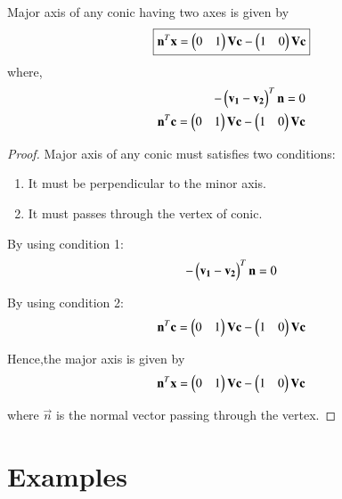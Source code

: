 \documentclass[journal,12pt,twocolumn]{IEEEtran}
\begin{document}
\begin{lemma}
Major axis of any conic having two axes is given by
\begin{align}
     \boxed{\mathbf{n}^T\mathbf{x} = \begin{pmatrix}0 & 1\end{pmatrix}\mathbf{V}\mathbf{c} - \begin{pmatrix}1 & 0\end{pmatrix}\mathbf{V}\mathbf{c}}
\end{align}
where,
\begin{align}
    -\begin{pmatrix}\mathbf{v_1} - \mathbf{v_2}\end{pmatrix}^T\mathbf{n} = 0 
    \\
    \mathbf{n}^T\mathbf{c} = \begin{pmatrix}0 & 1\end{pmatrix}\mathbf{V}\mathbf{c} - \begin{pmatrix}1 & 0\end{pmatrix}\mathbf{V}\mathbf{c}
\end{align}
\end{lemma}

\begin{proof}
Major axis of any conic must satisfies two conditions:

\begin{enumerate}
    \item It must be perpendicular to the minor axis.
    \item It must passes through the vertex of conic.
\end{enumerate}

By using condition 1:
\begin{align}
    -\begin{pmatrix}\mathbf{v_1} - \mathbf{v_2}\end{pmatrix}^T\mathbf{n} = 0 
\end{align}

By using condition 2:
\begin{align}
    \mathbf{n}^T\mathbf{c} = \begin{pmatrix}0 & 1\end{pmatrix}\mathbf{V}\mathbf{c} - \begin{pmatrix}1 & 0\end{pmatrix}\mathbf{V}\mathbf{c}
\end{align}

Hence,the major axis is given by
\begin{align}
    \mathbf{n}^T\mathbf{x} = \begin{pmatrix}0 & 1\end{pmatrix}\mathbf{V}\mathbf{c} - \begin{pmatrix}1 & 0\end{pmatrix}\mathbf{V}\mathbf{c}
\end{align}

where $\vec{n}$ is the normal vector passing through the vertex.
\end{proof}

\section{Examples}
\end{document}
